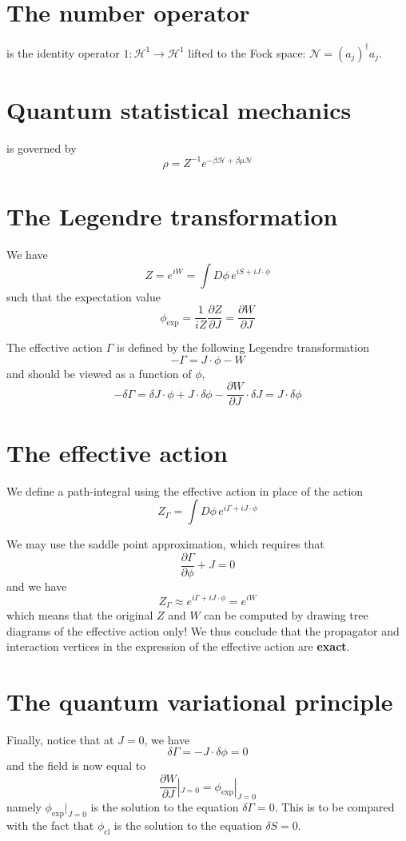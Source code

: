 \documentclass[12pt, oneside]{book}
\begin{document}
\section*{The number operator}
is the identity operator $1:\mathcal{H}^1\to\mathcal{H}^1$ lifted to the Fock space: $\mathcal{N}=(a_j)^{\dagger}a_j$.

\section*{Quantum statistical mechanics}
is governed by
\[
\rho=Z^{-1}e^{-\beta\mathcal{H}+\beta\mu\mathcal{N}}
\]

\section*{The Legendre transformation}
We have
\[
Z=e^{iW}=\int D\phi\,e^{iS+iJ\cdot\phi}
\]
such that the expectation value
\[
\phi_{\text{exp}}=\frac1{iZ}\frac{\partial Z}{\partial J}=\frac{\partial W}{\partial J}
\]

The effective action $\Gamma$ is defined by the following Legendre transformation
\[
-\Gamma=J\cdot\phi-W
\]
and should be viewed as a function of $\phi$,
\[
-\delta\Gamma=\delta J\cdot\phi+J\cdot\delta\phi-\frac{\partial W}{\partial J}\cdot\delta J=J\cdot\delta\phi
\]

\section*{The effective action}
We define a path-integral using the effective action in place of the action
\[
Z_{\Gamma}=\int D\phi\,e^{i\Gamma+iJ\cdot\phi}
\]

We may use the saddle point approximation, which requires that
\[
\frac{\partial\Gamma}{\partial\phi}+J=0
\]
and we have
\[
Z_{\Gamma}\approx e^{i\Gamma+iJ\cdot\phi}=e^{iW}
\]
which means that the original $Z$ and $W$ can be computed by drawing tree diagrams of the effective action only! We thus conclude that the propagator and interaction vertices in the expression of the effective action are \textbf{exact}.

\section*{The quantum variational principle}
Finally, notice that at $J=0$, we have
\[
\delta\Gamma=-J\cdot\delta\phi=0
\]
and the field is now equal to
\[
\frac{\partial W}{\partial J}|_{J=0}=\phi_{\text{exp}}|_{J=0}
\]
namely $\phi_{\text{exp}}|_{J=0}$ is the solution to the equation $\delta\Gamma=0$. This is to be compared with the fact that $\phi_{\text{cl}}$ is the solution to the equation $\delta S=0$.
\end{document}
